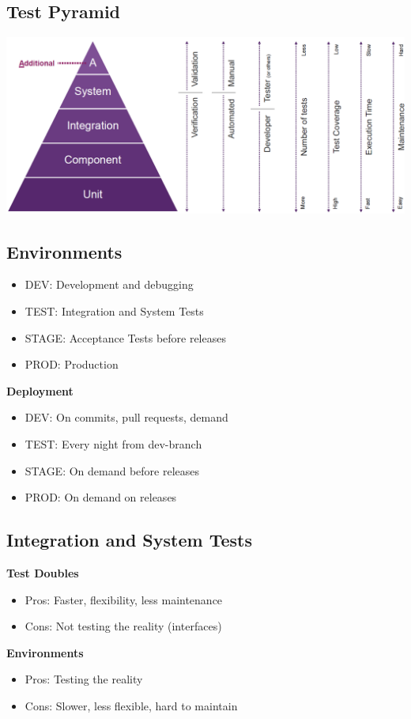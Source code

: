 \subsection{Test Pyramid}
\includegraphics[width=\linewidth]{../img/test_pyramid.png}

\subsection{Environments}
\begin{itemize}
    \item DEV: Development and debugging
    \item TEST: Integration and System Tests
    \item STAGE: Acceptance Tests before releases
    \item PROD: Production
\end{itemize}
\textbf{Deployment}
\begin{itemize}
    \item DEV: On commits, pull requests, demand
    \item TEST: Every night from dev-branch
    \item STAGE: On demand before releases
    \item PROD: On demand on releases
\end{itemize}

\subsection{Integration and System Tests}
\textbf{Test Doubles}
 \begin{itemize}
     \item Pros: Faster, flexibility, less maintenance
     \item Cons: Not testing the reality (interfaces)
 \end{itemize}
\textbf{Environments}
\begin{itemize}
    \item Pros: Testing the reality
    \item Cons: Slower, less flexible, hard to maintain
\end{itemize}

